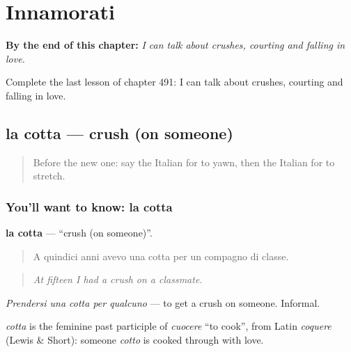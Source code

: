
\chapter{Innamorati}
\label{ch:it-innamorati}

\begin{chapteropening}
\textbf{By the end of this chapter:} \emph{I can talk about crushes, courting and falling in love.}

Complete the last lesson of chapter 491: I can talk about crushes, courting and falling in love.
\end{chapteropening}

\section[la cotta]{la cotta — crush (on someone)}

\label{lesson:IT-C491-cotta}



\begin{quote}
Before the new one: say the Italian for to yawn, then the Italian for to stretch.
\end{quote}

\subsection*{You'll want to know: la cotta}
\textbf{la cotta} — \textquotedblleft{}crush (on someone)\textquotedblright{}.

\begin{quote}
A quindici anni avevo una cotta per un compagno di classe.
\end{quote}

\begin{quote}
\emph{At fifteen I had a crush on a classmate.}
\end{quote}

\emph{Prendersi una cotta per qualcuno} — to get a crush on someone. Informal.

\begin{cousinweb}
\emph{cotta} is the feminine past participle of \emph{cuocere} \textquotedblleft{}to cook\textquotedblright{}, from Latin \emph{coquere} (Lewis \& Short): someone \emph{cotto} is cooked through with love.
\end{cousinweb}

